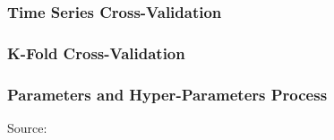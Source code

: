 \documentclass{beamer}
\begin{document}
\begin{frame}
  \frametitle{Time Series Cross-Validation}
  \end{frame}


\begin{frame}
  \frametitle{K-Fold Cross-Validation}
  \end{frame}

\begin{frame}
  \frametitle{Parameters and Hyper-Parameters Process}
  \hspace*{15pt}\hbox{\scriptsize Source:}
\end{frame}
\end{document}
